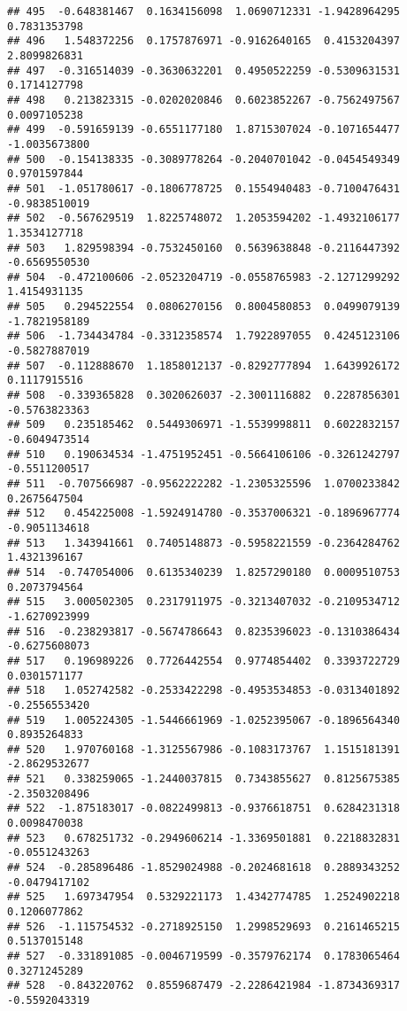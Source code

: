 \documentclass[
]{article}
\begin{document}
\begin{verbatim}
## 495  -0.648381467  0.1634156098  1.0690712331 -1.9428964295  0.7831353798
## 496   1.548372256  0.1757876971 -0.9162640165  0.4153204397  2.8099826831
## 497  -0.316514039 -0.3630632201  0.4950522259 -0.5309631531  0.1714127798
## 498   0.213823315 -0.0202020846  0.6023852267 -0.7562497567  0.0097105238
## 499  -0.591659139 -0.6551177180  1.8715307024 -0.1071654477 -1.0035673800
## 500  -0.154138335 -0.3089778264 -0.2040701042 -0.0454549349  0.9701597844
## 501  -1.051780617 -0.1806778725  0.1554940483 -0.7100476431 -0.9838510019
## 502  -0.567629519  1.8225748072  1.2053594202 -1.4932106177  1.3534127718
## 503   1.829598394 -0.7532450160  0.5639638848 -0.2116447392 -0.6569550530
## 504  -0.472100606 -2.0523204719 -0.0558765983 -2.1271299292  1.4154931135
## 505   0.294522554  0.0806270156  0.8004580853  0.0499079139 -1.7821958189
## 506  -1.734434784 -0.3312358574  1.7922897055  0.4245123106 -0.5827887019
## 507  -0.112888670  1.1858012137 -0.8292777894  1.6439926172  0.1117915516
## 508  -0.339365828  0.3020626037 -2.3001116882  0.2287856301 -0.5763823363
## 509   0.235185462  0.5449306971 -1.5539998811  0.6022832157 -0.6049473514
## 510   0.190634534 -1.4751952451 -0.5664106106 -0.3261242797 -0.5511200517
## 511  -0.707566987 -0.9562222282 -1.2305325596  1.0700233842  0.2675647504
## 512   0.454225008 -1.5924914780 -0.3537006321 -0.1896967774 -0.9051134618
## 513   1.343941661  0.7405148873 -0.5958221559 -0.2364284762  1.4321396167
## 514  -0.747054006  0.6135340239  1.8257290180  0.0009510753  0.2073794564
## 515   3.000502305  0.2317911975 -0.3213407032 -0.2109534712 -1.6270923999
## 516  -0.238293817 -0.5674786643  0.8235396023 -0.1310386434 -0.6275608073
## 517   0.196989226  0.7726442554  0.9774854402  0.3393722729  0.0301571177
## 518   1.052742582 -0.2533422298 -0.4953534853 -0.0313401892 -0.2556553420
## 519   1.005224305 -1.5446661969 -1.0252395067 -0.1896564340  0.8935264833
## 520   1.970760168 -1.3125567986 -0.1083173767  1.1515181391 -2.8629532677
## 521   0.338259065 -1.2440037815  0.7343855627  0.8125675385 -2.3503208496
## 522  -1.875183017 -0.0822499813 -0.9376618751  0.6284231318  0.0098470038
## 523   0.678251732 -0.2949606214 -1.3369501881  0.2218832831 -0.0551243263
## 524  -0.285896486 -1.8529024988 -0.2024681618  0.2889343252 -0.0479417102
## 525   1.697347954  0.5329221173  1.4342774785  1.2524902218  0.1206077862
## 526  -1.115754532 -0.2718925150  1.2998529693  0.2161465215  0.5137015148
## 527  -0.331891085 -0.0046719599 -0.3579762174  0.1783065464  0.3271245289
## 528  -0.843220762  0.8559687479 -2.2286421984 -1.8734369317 -0.5592043319

\end{verbatim}
\end{document}
